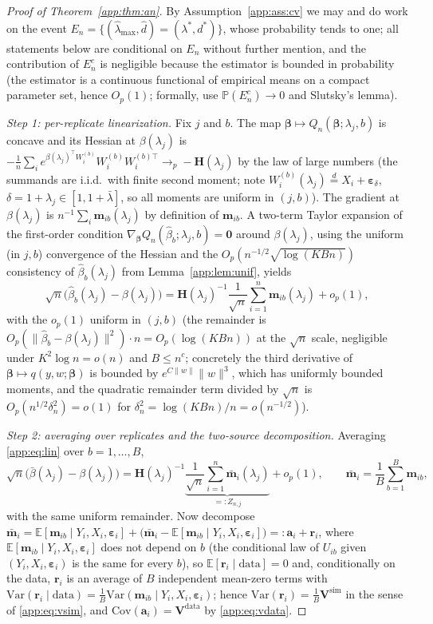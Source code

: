 \documentclass[11pt]{article}
\theoremstyle{plain}
\theoremstyle{definition}
\newcommand{\E}{\mathbb{E}}
\newcommand{\Prob}{\mathbb{P}}
\newcommand{\Var}{\mathrm{Var}}
\newcommand{\Cov}{\mathrm{Cov}}
\newcommand{\bet}{\bm{\beta}}
\newcommand{\beps}{\bm{\varepsilon}}
\newcommand{\btV}{\bm{V}}
\begin{document}
\begin{proof}[Proof of Theorem~\ref{app:thm:an}]
By Assumption~\ref{app:ass:cv} we may and do work on the event
$E_n=\{(\hat\lambda_{\max},\hat d)=(\lambda^*,d^*)\}$, whose probability
tends to one; all statements below are conditional on $E_n$ without
further mention, and the contribution of $E_n^c$ is negligible because
the estimator is bounded in probability (the estimator is a continuous
functional of empirical means on a compact parameter set, hence
$O_p(1)$; formally, use $\Prob(E_n^c)\to 0$ and Slutsky's lemma).

\emph{Step 1: per-replicate linearization.} Fix $j$ and $b$. The map
$\bet\mapsto Q_n(\bet;\lambda_j,b)$ is concave and its Hessian at
$\beta(\lambda_j)$ is
$-\frac1n\sum_i e^{\beta(\lambda_j)^\top W_i^{(b)}}W_i^{(b)}
W_i^{(b)\top}\to_p -\bm H(\lambda_j)$
by the law of large numbers (the summands are i.i.d.\ with finite second
moment; note $W_i^{(b)}(\lambda_j)\stackrel{d}{=}X_i+\beps_\delta$,
$\delta=1+\lambda_j\in[1,1+\bar\lambda]$, so all moments are uniform in
$(j,b)$). The gradient at $\beta(\lambda_j)$ is
$n^{-1}\sum_i\bm m_{ib}(\lambda_j)$ by definition of
$\bm m_{ib}$. A two-term Taylor expansion of the first-order condition
$\nabla_{\bet} Q_n(\hat\beta_b;\lambda_j,b)=\bm 0$ around
$\beta(\lambda_j)$, using the uniform (in $j,b$) convergence of the
Hessian and the $O_p(n^{-1/2}\sqrt{\log(KBn)})$ consistency of
$\hat\beta_b(\lambda_j)$ from Lemma~\ref{app:lem:unif}, yields
\begin{equation}\label{app:eq:lin}
  \sqrt n\bigl(\hat\beta_b(\lambda_j)-\beta(\lambda_j)\bigr)
  =\bm H(\lambda_j)^{-1}\frac{1}{\sqrt n}\sum_{i=1}^n
   \bm m_{ib}(\lambda_j)+o_p(1),
\end{equation}
with the $o_p(1)$ uniform in $(j,b)$ (the remainder is
$O_p(\|\hat\beta_b-\beta(\lambda_j)\|^2)\cdot n
=O_p(\log(KBn))$ at the $\sqrt n$ scale, negligible under
$K^2\log n=o(n)$ and $B\le n^c$; concretely the third derivative of
$\bet\mapsto q(y,w;\bet)$ is bounded by
$e^{C\|w\|}\|w\|^3$, which has uniformly bounded moments, and the
quadratic remainder term divided by $\sqrt n$ is
$O_p(n^{1/2}\delta_n^2)=o(1)$ for
$\delta_n^2=\log(KBn)/n=o(n^{-1/2})$).

\emph{Step 2: averaging over replicates and the two-source
decomposition.} Averaging \eqref{app:eq:lin} over $b=1,\dots,B$,
\[
  \sqrt n\bigl(\bar\beta(\lambda_j)-\beta(\lambda_j)\bigr)
  =\bm H(\lambda_j)^{-1}
   \underbrace{\frac{1}{\sqrt n}\sum_{i=1}^n
   \bar{\bm m}_i(\lambda_j)}_{=:Z_{n,j}}
   +o_p(1),
   \qquad
   \bar{\bm m}_i=\frac1B\sum_{b=1}^B\bm m_{ib},
\]
with the same uniform remainder. Now decompose
$\bar{\bm m}_i=\E[\bm m_{ib}\mid Y_i,X_i,\beps_i]
+\bigl(\bar{\bm m}_i-\E[\bm m_{ib}\mid Y_i,X_i,\beps_i]\bigr)
=:\bm a_i+\bm r_i$,
where $\E[\bm m_{ib}\mid Y_i,X_i,\beps_i]$ does not depend on $b$ (the
conditional law of $U_{ib}$ given $(Y_i,X_i,\beps_i)$ is the same for
every $b$), so $\E[\bm r_i\mid \text{data}]=0$ and, conditionally on the
data, $\bm r_i$ is an average of $B$ independent mean-zero terms with
$\Var(\bm r_i\mid\text{data})=\frac1B\Var(\bm m_{ib}\mid
Y_i,X_i,\beps_i)$; hence
$\Var(\bm r_i)=\frac1B\btV^{\mathrm{sim}}$ in the sense of
\eqref{app:eq:vsim}, and $\Cov(\bm a_i)=\btV^{\mathrm{data}}$ by
\eqref{app:eq:vdata}.


\end{proof}
\end{document}
